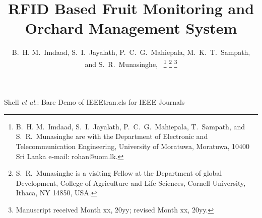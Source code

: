 \documentclass[journal]{IEEEtran}
\begin{document}
\title{RFID Based Fruit Monitoring and Orchard Management System}
\author{B.~H. M.~Imdaad, S.~I.~Jayalath, P.~C.~G.~Mahiepala, M.~K.~T.~Sampath,\\ and S.~R.~Munasinghe,~
\thanks{B.~H. M.~Imdaad, S.~I.~Jayalath, P.~C.~G.~Mahiepala, T.~Sampath, and S.~R.~Munasinghe are with the Department of Electronic and Telecommunication Engineering, University of Moratuwa, Moratuwa, 10400 Sri Lanka e-mail: rohan@uom.lk.}
\thanks{S.~R.~Munasinghe is a visiting Fellow at the Department of global Development, College of Agriculture and Life Sciences, Cornell University, Ithaca, NY 14850, USA.}
\thanks{Manuscript received Month xx, 20yy; revised Month xx, 20yy.}}

{Shell \MakeLowercase{\textit{et al.}}: Bare Demo of IEEEtran.cls for IEEE Journals}
\end{document}
